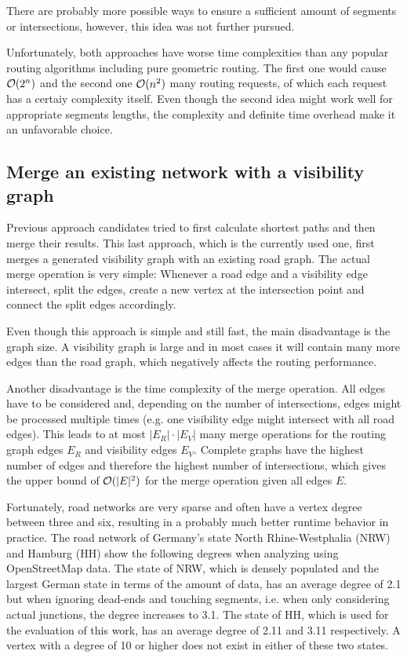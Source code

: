 		There are probably more possible ways to ensure a sufficient amount of segments or intersections, however, this idea was not further pursued.
		
		Unfortunately, both approaches have worse time complexities than any popular routing algorithms including pure geometric routing.
		The first one would cause $\mathcal{O}(2^n)$ and the second one $\mathcal{O}(n^2)$ many routing requests, of which each request has a certaiy complexity itself.
		Even though the second idea might work well for appropriate segments lengths, the complexity and definite time overhead make it an unfavorable choice.
	
	\subsection{Merge an existing network with a visibility graph}
	
		Previous approach candidates tried to first calculate shortest paths and then merge their results.
		This last approach, which is the currently used one, first merges a generated visibility graph with an existing road graph.
		The actual merge operation is very simple:
		Whenever a road edge and a visibility edge intersect, split the edges, create a new vertex at the intersection point and connect the split edges accordingly.
		
		Even though this approach is simple and still fast, the main disadvantage is the graph size.
		A visibility graph is large and in most cases it will contain many more edges than the road graph, which negatively affects the routing performance.
		
		Another disadvantage is the time complexity of the merge operation.
		All edges have to be considered and, depending on the number of intersections, edges might be processed multiple times (e.g. one visibility edge might intersect with all road edges).
		This leads to at most $|E_R| \cdot |E_V|$ many merge operations for the routing graph edges $E_R$ and visibility edges $E_V$.
		Complete graphs have the highest number of edges and therefore the highest number of intersections, which gives the upper bound of $\mathcal{O}(|E|^2)$ for the merge operation given all edges $E$.
		
		Fortunately, road networks are very sparse and often have a vertex degree between three and six\cite{zhao-analysis-osm-bejing}\cite{boeing-osmnx}, resulting in a probably much better runtime behavior in practice.
		The road network of Germany's state North Rhine-Westphalia (NRW) and Hamburg (HH) show the following degrees when analyzing using OpenStreetMap data.
		The state of NRW, which is densely populated and the largest German state in terms of the amount of data, has an average degree of 2.1 but when ignoring dead-ends and touching segments, i.e. when only considering actual junctions, the degree increases to 3.1.
		The state of HH, which is used for the evaluation of this work, has an average degree of 2.11 and 3.11 respectively.
		A vertex with a degree of 10 or higher does not exist in either of these two states.
		

